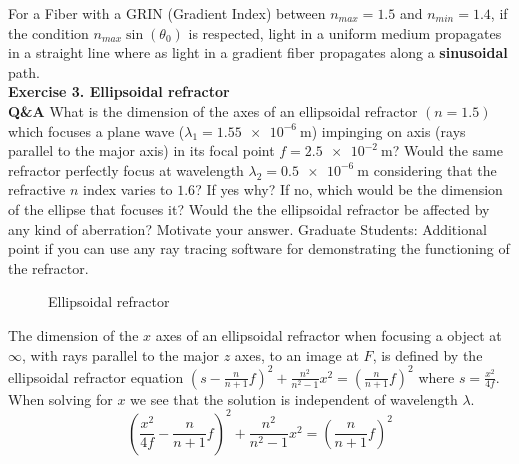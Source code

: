 \documentclass[main.tex]{subfiles}
\begin{document}
For a Fiber with a GRIN (Gradient Index) between $n_{max} = 1.5$ and $n_{min} = 1.4$, if the condition $n_{max}\sin(\theta_0)$ is respected, light in a uniform medium propagates in a straight line where as light in a gradient fiber propagates along a \textbf{sinusoidal} path.\\

\textbf{Exercise 3. Ellipsoidal refractor}\\
\textbf{Q\&A} What is the dimension of the axes of an ellipsoidal refractor $(n=1.5)$ which focuses a plane wave ($\lambda_1 = \SI{1.55e-6}{\meter}$) impinging on axis (rays parallel to the major axis) in its focal point $f =  \SI{2.5e-2}{\meter}$? Would the same refractor perfectly focus at wavelength $\lambda_2 = \SI{0.5e-6}{\meter}$ considering that the refractive $n$ index varies to $1.6$? If yes why? If no, which would be the dimension of the ellipse that focuses it? Would the the ellipsoidal refractor be affected by any kind of aberration? Motivate your answer. Graduate Students: Additional point if you can use any ray tracing software for demonstrating the functioning of the refractor.\\

\begin{figure}
\centering{}
\caption{Ellipsoidal refractor}
\label{fig:3}
\end{figure}

The dimension of the $x$ axes of an ellipsoidal refractor when focusing a object at $\infty$, with rays parallel to the major $z$ axes, to an image at $F$, is defined by the ellipsoidal refractor equation $\left(s-\frac{n}{n+1}f \right)^2 + \frac{n^2}{n^2 - 1}x^2 = \left(\frac{n}{n+1}f \right)^2$ where $s=\frac{x^2}{4f}$. When solving for $x$ we see that the solution is independent of wavelength $\lambda$.\\

\begin{equation}
\left(\frac{x^2}{4f}-\frac{n}{n+1}f \right)^2 + \frac{n^2}{n^2 - 1}x^2 = \left(\frac{n}{n+1}f \right)^2
\end{equation}
\end{document}
